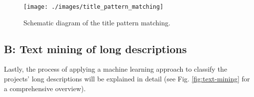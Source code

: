 \documentclass[
]{article}
\begin{document}
\begin{figure}

{\centering \texttt{[image: ./images/title\_pattern\_matching]} 

}

\caption{Schematic diagram of the title pattern matching.}\label{fig:title-pattern-matching}
\end{figure}

\hypertarget{b-text-mining-of-long-descriptions}{%
\subsection{\texorpdfstring{\textbf{B}: Text mining of long descriptions}{B: Text mining of long descriptions}}\label{b-text-mining-of-long-descriptions}}

Lastly, the process of applying a machine learning approach to classify the projects' long descriptions will be explained in detail (see Fig. \ref{fig:text-mining} for a comprehensive overview).
\end{document}
